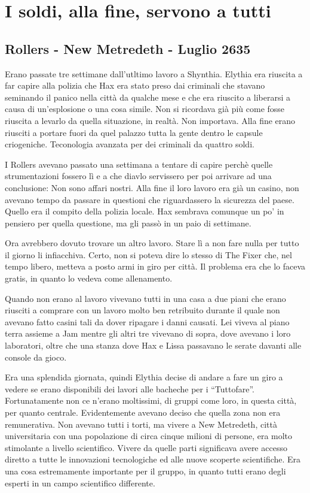 \chapter{I soldi, alla fine, servono a tutti}

  \section{Rollers - New Metredeth - Luglio 2635}

    Erano passate tre settimane dall'utltimo lavoro a Shynthia. Elythia era
    riuscita a far capire alla polizia che Hax era stato preso dai
    criminali che stavano seminando il panico nella città da qualche mese
    e che era riuscito a liberarsi a causa di un'esplosione o una cosa
    simile. Non si ricordava già più come fosse riuscita a levarlo da
    quella situazione, in realtà. Non importava. Alla fine erano riusciti a
    portare fuori da quel palazzo tutta la gente dentro le capsule
    criogeniche. Teconologia avanzata per dei criminali da quattro soldi.

    I Rollers avevano passato una settimana a tentare di capire perchè
    quelle strumentazioni fossero lì e a che diavlo servissero per poi
    arrivare ad una conclusione: Non sono affari nostri. Alla fine il loro
    lavoro era già un casino, non avevano tempo da passare in questioni che
    riguardassero la sicurezza del paese. Quello era il compito della
    polizia locale. Hax sembrava comunque un po' in pensiero per quella
    questione, ma gli passò in un paio di settimane.

    Ora avrebbero dovuto trovare un altro lavoro. Stare lì a non fare nulla
    per tutto il giorno li infiacchiva. Certo, non si poteva dire lo stesso
    di The Fixer che, nel tempo libero, metteva a posto armi in giro per
    città. Il problema era che lo faceva gratis, in quanto lo vedeva come
    allenamento.

    Quando non erano al lavoro vivevano tutti in una casa a due piani che
    erano riusciti a comprare con un lavoro molto ben retribuito durante il
    quale non avevano fatto casini tali da dover ripagare i danni causati.
    Lei viveva al piano terra assieme a Jam mentre gli altri tre vivevano
    di sopra, dove avevano i loro laboratori, oltre che una stanza dove Hax
    e Lissa passavano le serate davanti alle console da gioco.

    Era una splendida giornata, quindi Elythia decise di andare a fare un
    giro a vedere se erano disponibili dei lavori alle bacheche per i
    ``Tuttofare''. Fortunatamente non ce n'erano moltissimi, di gruppi come
    loro, in questa città, per quanto centrale. Evidentemente avevano
    deciso che quella zona non era remunerativa. Non avevano tutti i torti,
    ma vivere a New Metredeth, città universitaria con una popolazione
    di circa cinque milioni di persone, era molto stimolante a livello
    scientifico. Vivere da quelle parti significava avere accesso diretto a
    tutte le innovazioni tecnologiche ed alle nuove scoperte scientifiche.
    Era una cosa estremamente importante per il gruppo, in quanto tutti
    erano degli esperti in un campo scientifico differente.


